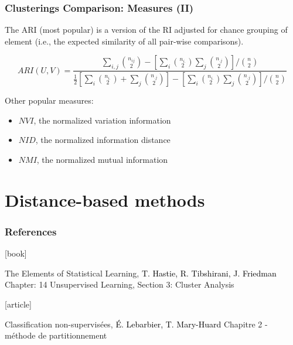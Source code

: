 \documentclass{beamer}\usepackage[]{graphicx}\usepackage[]{color}
\begin{document}
\begin{frame}
  \frametitle{Clusterings Comparison: Measures (II)}

The ARI (most popular) is a version of the RI adjusted for chance grouping of element (i.e., the expected similarity of all pair-wise comparisons).

\begin{definition}
	\begin{displaymath}
		ARI(U, V) = 
			\frac{ 
			\sum_{i,j} {n_{ij} \choose 2} - 
			\left[ \sum_i {n_{i.} \choose 2} \sum_j {n_{.j} \choose 2} \right] 
			/ {n \choose 2} }
		     	{ 
			\frac{1}{2} \left[ \sum_i {n_{i.} \choose 2} + \sum_j {n_{.j} \choose 2} \right] -
			\left[ \sum_i {n_{i.} \choose 2} \sum_j {n_{.j} \choose 2} \right] 
			/ {n \choose 2} 
			}
	\end{displaymath}
  \end{definition}
  
  Other popular measures:
  \begin{itemize}
    \item $NVI$, the normalized variation information
    \item $NID$, the normalized information distance
    \item $NMI$, the normalized mutual information
  \end{itemize}
  
\end{frame}

\section{Distance-based methods}

\begin{frame}
  \frametitle{References}

    \begin{thebibliography}{99}
      [book]

     The Elements of Statistical Learning,
    \newblock \textcolor{black}{T. Hastie, R. Tibshirani, J. Friedman}
    \newblock \alert{Chapter: 14 Unsupervised Learning, Section 3: Cluster Analysis}

      [article]

     Classification non-supervisées,
    \newblock \textcolor{black}{É. Lebarbier, T. Mary-Huard}
    \newblock \alert{Chapitre 2 - méthode de partitionnement}

    \end{thebibliography}


\end{frame}
\end{document}
